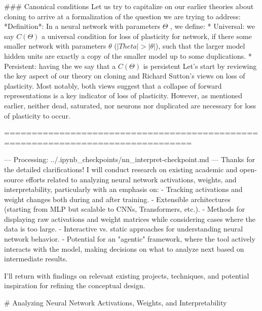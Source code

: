 ### Canonical conditions
Let us try to capitalize on our earlier theories about cloning to arrive at a formalization of the question we are trying to address: 
 *Definition*: In a neural network with parameters $\Theta$ , we define:
* Universal: we say $C(\Theta)$ a universal condition for loss of plasticity for network, if there some smaller network  with parameters $\theta$ ($|Theta| > |\theta|$), such that the larger model hidden units are exactly a copy of the smaller model up to some duplications. 
* Persistent:  having the we say that a $C(\Theta)$ is persistent
Let’s start by reviewing the key aspect of our theory on cloning and Richard Sutton’s views on loss of plasticity. Most notably, both views suggest that  a collapse of forward representations is a key indicator of loss of plasticity. However, as mentioned earlier, neither dead, saturated, nor neurons nor duplicated are necessary for loss of plasticity to occur. 






================================================================================

--- Processing: ../.ipynb_checkpoints/nn_interpret-checkpoint.md ---
Thanks for the detailed clarifications! I will conduct research on existing academic and open-source efforts related to analyzing neural network activations, weights, and interpretability, particularly with an emphasis on:
- Tracking activations and weight changes both during and after training.
- Extensible architectures (starting from MLP but scalable to CNNs, Transformers, etc.).
- Methods for displaying raw activations and weight matrices while considering cases where the data is too large.
- Interactive vs. static approaches for understanding neural network behavior.
- Potential for an "agentic" framework, where the tool actively interacts with the model, making decisions on what to analyze next based on intermediate results.

I'll return with findings on relevant existing projects, techniques, and potential inspiration for refining the conceptual design.

# Analyzing Neural Network Activations, Weights, and Interpretability


